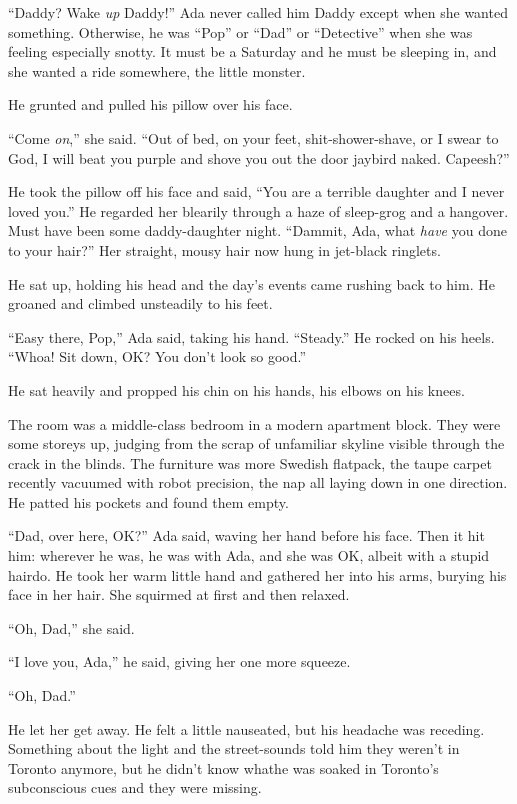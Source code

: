 \tb

“Daddy? Wake \emph{up} Daddy!” Ada never called him Daddy except
when she wanted something. Otherwise, he was “Pop” or “Dad” or
“Detective” when she was feeling especially snotty. It must be a
Saturday and he must be sleeping in, and she wanted a ride
somewhere, the little monster.

He grunted and pulled his pillow over his face.

“Come \emph{on},” she said. “Out of bed, on your feet,
shit-shower-shave, or I swear to God, I will beat you purple and
shove you out the door jaybird naked. Capeesh?”

He took the pillow off his face and said, “You are a terrible
daughter and I never loved you.” He regarded her blearily through a
haze of sleep-grog and a hangover. Must have been some
daddy-daughter night. “Dammit, Ada, what \emph{have} you done to
your hair?” Her straight, mousy hair now hung in jet-black
ringlets.

He sat up, holding his head and the day’s events came rushing back
to him. He groaned and climbed unsteadily to his feet.

“Easy there, Pop,” Ada said, taking his hand. “Steady.” He rocked
on his heels. “Whoa! Sit down, OK? You don’t look so good.”

He sat heavily and propped his chin on his hands, his elbows on his
knees.

The room was a middle-class bedroom in a modern apartment block.
They were some storeys up, judging from the scrap of unfamiliar
skyline visible through the crack in the blinds. The furniture was
more Swedish flatpack, the taupe carpet recently vacuumed with
robot precision, the nap all laying down in one direction. He
patted his pockets and found them empty.

“Dad, over here, OK?” Ada said, waving her hand before his face.
Then it hit him: wherever he was, he was with Ada, and she was OK,
albeit with a stupid hairdo. He took her warm little hand and
gathered her into his arms, burying his face in her hair. She
squirmed at first and then relaxed.

“Oh, Dad,” she said.

“I love you, Ada,” he said, giving her one more squeeze.

“Oh, Dad.”

He let her get away. He felt a little nauseated, but his headache
was receding. Something about the light and the street-sounds told
him they weren’t in Toronto anymore, but he didn’t know what{\dash}he was
soaked in Toronto’s subconscious cues and they were missing.

